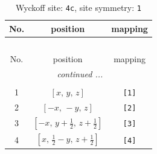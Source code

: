 \documentclass[fleqn,8pt]{jsarticle}
\begin{document}
\begin{longtable}{ccc}
\caption{Wyckoff site: {\tt 4c}, site symmetry: {\tt 1}}
 \\
 \hline \hline
No. & position & mapping \\ \hline \endfirsthead

\multicolumn{2}{l}{\tablename\ \thetable{}} \\
 \hline \hline
No. & position & mapping \\ \hline \endhead

 \hline \hline
\multicolumn{2}{r}{\footnotesize\it continued ...} \\ \endfoot

 \hline \hline
\multicolumn{2}{r}{} \\ \endlastfoot

1 & $\left[ x,\, y,\, z \right]$ & {\tt [1]} \\ \hline
2 & $\left[ - x,\, - y,\, z \right]$ & {\tt [2]} \\ \hline
3 & $\left[ - x,\, y + \frac{1}{2},\, z + \frac{1}{2} \right]$ & {\tt [3]} \\ \hline
4 & $\left[ x,\, \frac{1}{2} - y,\, z + \frac{1}{2} \right]$ & {\tt [4]} \\
\end{longtable}
\end{document}
